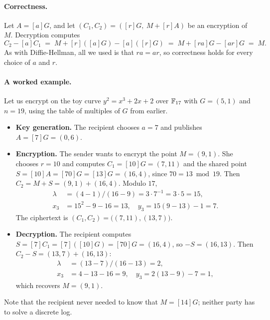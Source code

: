 \paragraph{Correctness.}
Let $A = [a]G$, and let $(C_1, C_2) = ([r]G,\ M + [r]A)$ be an encryption
of $M$. Decryption computes
\[ C_2 - [a]C_1
   \;=\; M + [r]([a]G) - [a]([r]G)
   \;=\; M + [ra]G - [ar]G
   \;=\; M. \]
As with Diffie-Hellman, all we used is that $ra = ar$, so correctness
holds for every choice of $a$ and $r$.

\paragraph{A worked example.}
Let us encrypt on the toy curve $y^2 = x^3 + 2x + 2$ over $\mathbb{F}_{17}$ with
$G = (5, 1)$ and $n = 19$, using the table of multiples of $G$ from
earlier.
\begin{itemize}
  \item \textbf{Key generation.} The recipient chooses $a = 7$ and
        publishes $A = [7]G = (0, 6)$.
  \item \textbf{Encryption.} The sender wants to encrypt the point
        $M = (9, 1)$. She chooses $r = 10$ and computes
        $C_1 = [10]G = (7, 11)$ and the shared point
        $S = [10]A = [70]G = [13]G = (16, 4)$, since $70 = 13 \bmod 19$.
        Then $C_2 = M + S = (9, 1) + (16, 4)$. Modulo $17$,
        \begin{align*}
          \lambda &= (4 - 1)/(16 - 9) = 3 \cdot 7^{-1} = 3 \cdot 5 = 15,\\
          x_3 &= 15^2 - 9 - 16 = 13, \quad y_3 = 15(9 - 13) - 1 = 7.
        \end{align*}
        The ciphertext is $(C_1, C_2) = \big((7, 11), (13, 7)\big)$.
  \item \textbf{Decryption.} The recipient computes
        $S = [7]C_1 = [7]([10]G) = [70]G = (16, 4)$, so $-S = (16, 13)$.
        Then $C_2 - S = (13, 7) + (16, 13)$:
        \begin{align*}
          \lambda &= (13 - 7)/(16 - 13) = 2,\\
          x_3 &= 4 - 13 - 16 = 9, \quad y_3 = 2(13 - 9) - 7 = 1,
        \end{align*}
        which recovers $M = (9, 1)$.
\end{itemize}
Note that the recipient never needed to know that $M = [14]G$; neither
party has to solve a discrete log.

